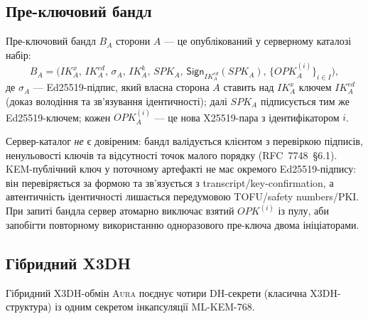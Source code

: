 \documentclass[11pt,a4paper]{article}
\theoremstyle{definition}
\newcommand{\KEM}{\textsf{ML-KEM-768}}
\newcommand{\IK}{\ensuremath{\mathit{IK}}}
\newcommand{\SPK}{\ensuremath{\mathit{SPK}}}
\newcommand{\OPK}{\ensuremath{\mathit{OPK}}}
\newcommand{\Aura}{\mbox{\normalfont\scshape Aura}}
\begin{document}
\subsection{Пре-ключовий бандл}\label{sec:bundle}

Пре-ключовий бандл $B_A$ сторони $A$ — це опублікований у серверному каталозі
набір:
\begin{equation}\label{eq:prekey-bundle}
  B_A = \big(\IK_A^x, \, \IK_A^{ed}, \, \sigma_A, \, \IK_A^k, \, \SPK_A, \,
            \mathsf{Sign}_{\IK_A^{ed}}(\SPK_A), \,
            \{\OPK_A^{(i)}\}_{i \in I}\big),
\end{equation}
де $\sigma_A$ — Ed25519-підпис, який власна сторона $A$ ставить
над $\IK_A^x$ ключем $\IK_A^{ed}$ (доказ володіння та зв'язування
ідентичності); далі $\SPK_A$ підписується тим же Ed25519-ключем;
кожен
$\OPK_A^{(i)}$ — це нова X25519-пара з ідентифікатором $i$.

Сервер-каталог \emph{не} є довіреним: бандл валідується клієнтом
з перевіркою підписів, ненульовості ключів та
відсутності точок малого порядку (RFC~7748~\S6.1). KEM-публічний ключ
у поточному артефакті не має окремого Ed25519-підпису: він перевіряється
за формою та зв'язується з transcript/key-confirmation, а автентичність
ідентичності лишається передумовою TOFU/safety numbers/PKI. При запиті
бандла сервер атомарно виключає взятий $\OPK^{(i)}$ із пулу, аби
запобігти повторному використанню одноразового пре-ключа двома
ініціаторами.

\subsection{Гібридний X3DH}\label{sec:handshake}

Гібридний X3DH-обмін \Aura{} поєднує чотири DH-секрети
(класична X3DH-структура) із одним секретом інкапсуляції \KEM{}.
\end{document}
